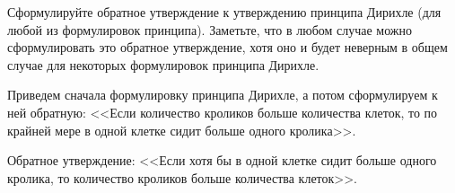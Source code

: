 \begin{task}{5}
	Сформулируйте обратное утверждение к утверждению принципа Дирихле (для любой из формулировок принципа). Заметьте, что в любом случае можно сформулировать это обратное утверждение, хотя оно и будет неверным в общем случае для некоторых формулировок принципа Дирихле. 
\end{task}

\begin{solution}
	Приведем сначала формулировку принципа Дирихле, а потом сформулируем к ней обратную: <<Если количество кроликов больше количества клеток, то по крайней мере в одной клетке сидит больше одного кролика>>.  
	
	Обратное утверждение: <<Если хотя бы в одной клетке сидит больше одного кролика, то количество кроликов больше количества клеток>>.
\end{solution}